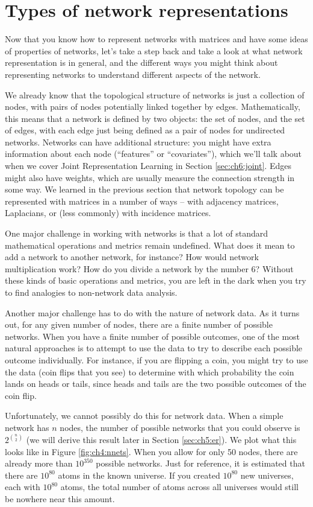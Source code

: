 \section{Types of network representations}
\label{sec:ch4:net-rep}

Now that you know how to represent networks with matrices and have some ideas of properties of networks, let's take a step back and take a look at what network representation is in general, and the different ways you might think about representing networks to understand different aspects of the network.

We already know that the topological structure of networks is just a collection of nodes, with pairs of nodes potentially linked together by edges. Mathematically, this means that a network is defined by two objects: the set of nodes, and the set of edges, with each edge just being defined as a pair of nodes for undirected networks. Networks can have additional structure: you might have extra information about each node (``features'' or ``covariates''), which we'll talk about when we cover Joint Representation Learning in Section \ref{sec:ch6:joint}. Edges might also have weights, which are usually measure the connection strength in some way. We learned in the previous section that network topology can be represented with matrices in a number of ways -- with adjacency matrices, Laplacians, or (less commonly) with incidence matrices. 

One major challenge in working with networks is that a lot of standard mathematical operations and metrics remain undefined. What does it mean to add a network to another network, for instance? How would network multiplication work? How do you divide a network by the number 6? Without these kinds of basic operations and metrics, you are left in the dark when you try to find analogies to non-network data analysis.

Another major challenge has to do with the nature of network data. As it turns out, for any given number of nodes, there are a finite number of possible networks. When you have a finite number of possible outcomes, one of the most natural approaches is to attempt to use the data to try to describe each possible outcome individually. For instance, if you are flipping a coin, you might try to use the data (coin flips that you see) to determine with which probability the coin lands on heads or tails, since heads and tails are the two possible outcomes of the coin flip.

Unfortunately, we cannot possibly do this for network data. When a simple network has $n$ nodes, the number of possible networks that you could observe is $2^{\binom n 2}$ (we will derive this result later in Section \ref{sec:ch5:er}). We plot what this looks like in Figure \ref{fig:ch4:nnets}. When you allow for only 50 nodes, there are already more than $10^{350}$ possible networks. Just for reference, it is estimated that there are $10^{80}$ atoms in the known universe. If you created $10^{80}$ new universes, each with $10^{80}$ atoms, the total number of atoms across all universes would still be nowhere near this amount. 

